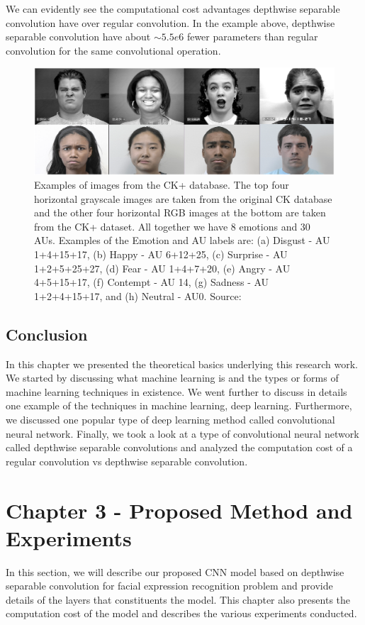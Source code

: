 \documentclass[master]{thesis-uestc}
\begin{document}
We can evidently see the computational cost advantages depthwise separable convolution have over regular convolution. In the example above, depthwise separable convolution have about $\sim5.5e6$ fewer parameters than regular convolution for the same convolutional operation.

\begin{figure}[ht]
\includegraphics[width=5in]{pic/ck+.PNG}
\caption{Examples of images from the CK+ database. The top four horizontal grayscale images are taken from the original CK database and the other four horizontal RGB images at the bottom are taken from the CK+ dataset. All together we have 8 emotions and 30 AUs. Examples of the Emotion and AU labels
are: (a) Disgust - AU 1+4+15+17, (b) Happy - AU 6+12+25, (c) Surprise - AU 1+2+5+25+27, (d) Fear - AU 1+4+7+20, (e) Angry - AU 4+5+15+17, (f) Contempt - AU 14, (g) Sadness - AU 1+2+4+15+17, and (h) Neutral - AU0. Source: }
\label{CK+_images}
\end{figure}

\section{Conclusion}
In this chapter we presented the theoretical basics underlying this research work. We started by discussing what machine learning is and the types or forms of machine learning techniques in existence. We went further to discuss in details one example of the techniques in machine learning, deep learning. Furthermore, we discussed one popular type of deep learning method called convolutional neural network. Finally, we took a look at a type of convolutional neural network called depthwise separable convolutions and analyzed the computation cost of a regular convolution vs depthwise separable convolution.

\chapter{Chapter 3 - Proposed Method and Experiments}
In this section, we will describe our proposed CNN model based on depthwise separable convolution for facial expression recognition problem and provide details of the layers that constituents the model. This chapter also presents the computation cost of the model and describes the various experiments conducted.
\end{document}
